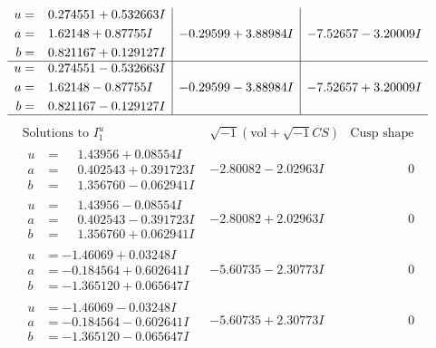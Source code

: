 \documentclass[1p]{elsarticle_modified}
\theoremstyle{definition}
\newcommand{\I}{\sqrt{-1}}
\begin{document}
$$\begin{array}{c|c|c}
\begin{aligned}
u &= \phantom{-}0.274551 + 0.532663 I \\
a &= \phantom{-}1.62148 + 0.87755 I \\
b &= \phantom{-}0.821167 + 0.129127 I\end{aligned}
 & -0.29599 + 3.88984 I & -7.52657 - 3.20009 I \\ \hline\begin{aligned}
u &= \phantom{-}0.274551 - 0.532663 I \\
a &= \phantom{-}1.62148 - 0.87755 I \\
b &= \phantom{-}0.821167 - 0.129127 I\end{aligned}
 & -0.29599 - 3.88984 I & -7.52657 + 3.20009 I\\
 \hline 
 \end{array}$$\newpage$$\begin{array}{c|c|c}  
\text{Solutions to }I^u_{1}& \I (\text{vol} + \sqrt{-1}CS) & \text{Cusp shape}\\
 \hline 
\begin{aligned}
u &= \phantom{-}1.43956 + 0.08554 I \\
a &= \phantom{-}0.402543 + 0.391723 I \\
b &= \phantom{-}1.356760 - 0.062941 I\end{aligned}
 & -2.80082 - 2.02963 I & \phantom{-0.000000 } 0 \\ \hline\begin{aligned}
u &= \phantom{-}1.43956 - 0.08554 I \\
a &= \phantom{-}0.402543 - 0.391723 I \\
b &= \phantom{-}1.356760 + 0.062941 I\end{aligned}
 & -2.80082 + 2.02963 I & \phantom{-0.000000 } 0 \\ \hline\begin{aligned}
u &= -1.46069 + 0.03248 I \\
a &= -0.184564 + 0.602641 I \\
b &= -1.365120 + 0.065647 I\end{aligned}
 & -5.60735 - 2.30773 I & \phantom{-0.000000 } 0 \\ \hline\begin{aligned}
u &= -1.46069 - 0.03248 I \\
a &= -0.184564 - 0.602641 I \\
b &= -1.365120 - 0.065647 I\end{aligned}
 & -5.60735 + 2.30773 I & \phantom{-0.000000 } 0 \\ \hline\begin{aligned}

\end{aligned}
\end{array}$$
\end{document}
